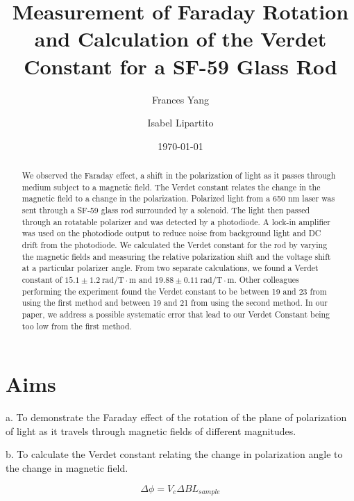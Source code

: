 \documentclass[prb,preprint]{revtex4-1}
\begin{document}
\title{Measurement of Faraday Rotation and Calculation of the Verdet Constant for a SF-59 Glass Rod}

\author{Frances Yang}

\author{Isabel Lipartito}

\date{\today}

\begin{abstract}
{We observed the Faraday effect, a shift in the polarization of light as it passes through medium subject to a magnetic field. The Verdet constant relates the change in the magnetic field to a change in the polarization.  Polarized light from a 650 nm laser was sent through a SF-59 glass rod surrounded by a solenoid. The light then passed through an rotatable polarizer and was detected by a photodiode. A lock-in amplifier was used on the photodiode output to reduce noise from background light and DC drift from the photodiode. We calculated the Verdet constant for the rod by varying the magnetic fields and measuring the relative polarization shift and the voltage shift at a particular polarizer angle. From two separate calculations, we found a Verdet constant of $15.1 \pm 1.2 \mathrm{~rad/T} \cdot \textrm{m}$ and $19.88 \pm 0.11 \mathrm{~rad/T} \cdot \textrm{m}$. Other colleagues performing the experiment found the Verdet constant to be between 19 and 23 from using the first method and between 19 and 21 from using the second method.  In our paper, we address a possible systematic error that lead to our Verdet Constant being too low from the first method.

}
\end{abstract}

\maketitle 
\section{Aims}
{a.  To demonstrate the Faraday effect of the rotation of the plane of polarization of light as it travels through magnetic fields of different magnitudes.

b.  To calculate the Verdet constant relating the change in polarization angle to the change in magnetic field.}
\begin{equation}
\Delta \phi =V_{c} \Delta B L{_{sample}}
\end{equation}
\end{document}
